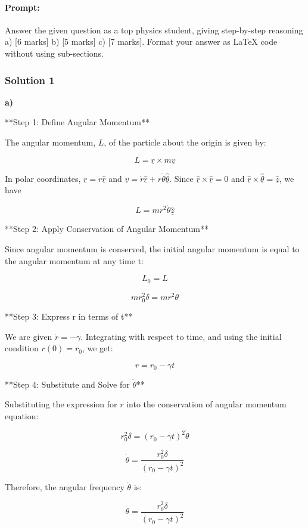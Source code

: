 \documentclass{article}
\begin{document}
\paragraph{Prompt: \\} 
Answer the given question as a top physics student, giving step-by-step reasoning a) [6 marks] b) [5 marks] c) [7 marks]. Format your answer as LaTeX code without using sub-sections. 

\subsubsection{Solution 1}
\textbf{a)}

**Step 1: Define Angular Momentum**

The angular momentum, $L$, of the particle about the origin is given by:

\[L = \underline{r} \times m\underline{v}\]

In polar coordinates, $\underline{r} = r\underline{\hat{r}}$ and $\underline{v} = \dot{r}\underline{\hat{r}} + r\dot{\theta}\underline{\hat{\theta}}$. Since $\underline{\hat{r}} \times \underline{\hat{r}} = 0$ and $\underline{\hat{r}} \times \underline{\hat{\theta}} = \underline{\hat{z}}$, we have

\[L = mr^2\dot{\theta}\underline{\hat{z}}\]

**Step 2: Apply Conservation of Angular Momentum**

Since angular momentum is conserved, the initial angular momentum is equal to the angular momentum at any time t:

\[L_0 = L\]

\[mr_0^2\delta = mr^2\dot{\theta}\]

**Step 3: Express r in terms of t**

We are given $\dot{r} = -\gamma$. Integrating with respect to time, and using the initial condition $r(0) = r_0$, we get:

\[r = r_0 - \gamma t\]

**Step 4: Substitute and Solve for $\dot{\theta}$**

Substituting the expression for $r$ into the conservation of angular momentum equation:

\[r_0^2\delta = (r_0 - \gamma t)^2\dot{\theta}\]

\[\dot{\theta} = \frac{r_0^2\delta}{(r_0 - \gamma t)^2}\]

Therefore, the angular frequency $\dot{\theta}$ is:

\[\boxed{\dot{\theta} = \frac{r_0^2\delta}{(r_0 - \gamma t)^2}}\]
\end{document}
